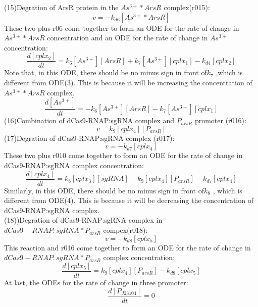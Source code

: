 (15)Degration of ArsR protein in the  $As^{3+}*ArsR$ complex(r015):
\begin{displaymath}
v=-k_{d6}[As^{3+}*ArsR]
\end{displaymath}
These two plus r06 come together to form an ODE for the rate of change in $As^{3+}*ArsR$  concentration and an ODE for the rate of change in $As^{3+}$ concentration:
\begin{equation}
\frac{d[cplx_2]}{dt}=k_{6}[As^{3+}][ArsR]+k_7[As^{3+}][cplx_1]-k_{d4}[cplx_2] \tag{6}
\end{equation}
Note that, in this ODE, there should be no minus sign in front of$k_7$ ,which is different from ODE(3). This is because it will be increasing the concentration of  $As^{3+}*ArsR$ complex.\\
\begin{equation}
\frac{d[As^{3+}]}{dt}=-k_{6}[As^{3+}][ArsR]-k_7[As^{3+}][cplx_1] \tag{7}
\end{equation}
(16)Combination of dCas9-RNAP:sgRNA complex and $P_{arsR}$ promoter (r016):
\begin{displaymath}
v=k_{9}[cplx_4][P_{arsR}]
\end{displaymath}
(17)Degration of dCas9-RNAP:sgRNA complex (r017): 
\begin{displaymath}
v=-k_{d7}[cplx_4]
\end{displaymath}
These two plus r010 come together to form an ODE for the rate of change in dCas9-RNAP:sgRNA complex concentration:
\begin{equation}
\frac{d[cplx_4]}{dt}=k_{8}[cplx_3][sgRNA]-k_{9}[cplx_4][P_{arsR}]-k_{d7}[cplx_4]\tag{8}
\end{equation}
Similarly, in this ODE, there should be no minus sign in front of$k_8$ , which is different from ODE(4). This is because it will be decreasing the concentration of dCas9-RNAP:sgRNA complex.\\
(18))Degration of dCas9-RNAP:sgRNA complex in $dCas9-RNAP:sgRNA*P_{arsR}$ compex(r018):
\begin{displaymath}
v=-k_{d8}[cplx_5]
\end{displaymath}
This reaction and r016 come together to form an ODE for the rate of change in $dCas9-RNAP:sgRNA*P_{arsR}$ complex concentration:
\begin{equation}
\frac{d[cplx_5]}{dt}=k_{9}[cplx_4][P_{arsR}]-k_{d8}[cplx_5]\tag{9}
\end{equation} 
At last, the ODEs for the rate of change in three promoter:
\begin{equation}
\frac{d[P_{J23104}]}{dt}=0\tag{10}
\end{equation} 
